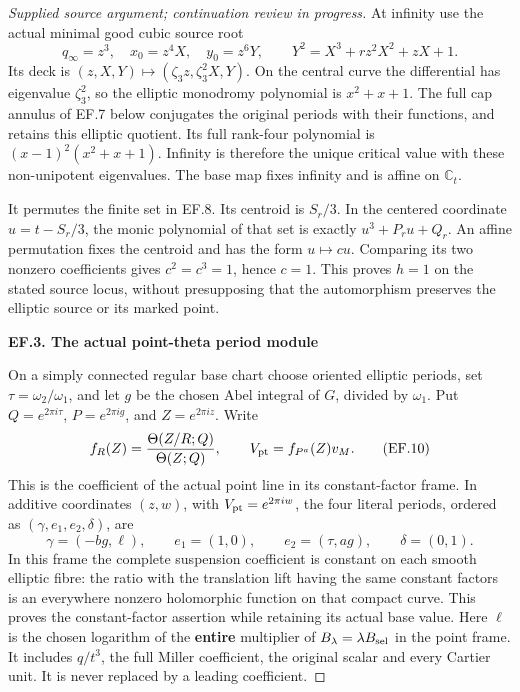 \begin{proof}[Supplied source argument; continuation review in progress]
At infinity use the actual minimal good cubic source root
\[
 q_\infty=z^3,\quad x_0=z^4X,\quad y_0=z^6Y,\qquad
 Y^2=X^3+r z^2X^2+zX+1.
 \tag{EF.9}
\]
Its deck is \((z,X,Y)\mapsto(\zeta_3z,\zeta_3^2X,Y)\).
On the central curve the differential has eigenvalue \(\zeta_3^2\),
so the elliptic monodromy polynomial is \(x^2+x+1\). The full cap
annulus of EF.7 below conjugates the original periods with their
functions, and retains this elliptic quotient. Its full rank-four
polynomial is \((x-1)^2(x^2+x+1)\). Infinity is therefore the unique
critical value with these non-unipotent eigenvalues. The base map fixes
infinity and is affine on \(\mathbb C_t\).

It permutes the finite set in EF.8. Its centroid is \(S_r/3\).
In the centered coordinate \(u=t-S_r/3\), the monic polynomial of
that set is exactly \(u^3+P_ru+Q_r\). An affine permutation fixes
the centroid and has the form \(u\mapsto c u\). Comparing its two
nonzero coefficients gives \(c^2=c^3=1\), hence \(c=1\).
This proves \(h=1\) on the stated source locus, without presupposing
that the automorphism preserves the elliptic source or its marked point.

\par

\medskip\noindent\textbf{EF.3. The actual point-theta period module}

\par\nobreak

On a simply connected regular base chart choose oriented elliptic
periods, set \(\tau=\omega_2/\omega_1\), and let \(g\) be the
chosen Abel integral of \(G\), divided by \(\omega_1\). Put
\(Q=e^{2\pi i\tau}\), \(P=e^{2\pi ig}\), and
\(Z=e^{2\pi iz}\). Write
\[
 f_R(Z)=\frac{\Theta(Z/R;Q)}{\Theta(Z;Q)},\qquad
 V_{\rm pt}=f_{P^a}(Z)v_M.
 \tag{EF.10}
\]
This is the coefficient of the actual point line in its constant-factor
frame. In additive coordinates \((z,w)\), with
\(V_{\rm pt}=e^{2\pi iw}\), the four literal periods, ordered as
\((\gamma,e_1,e_2,\delta)\), are
\[
 \gamma=(-bg,\ell),\qquad e_1=(1,0),\qquad
 e_2=(\tau,ag),\qquad \delta=(0,1).
 \tag{EF.11}
\]
In this frame the complete suspension coefficient is constant on each
smooth elliptic fibre: the ratio with the translation lift having the
same constant factors is an everywhere nonzero holomorphic function on
that compact curve. This proves the constant-factor assertion while
retaining its actual base value. Here \(\ell\) is the chosen logarithm
of the \textbf{entire} multiplier
of \(B_\lambda=\lambda B_{\rm sel}\) in the point frame. It includes
\(q/t^3\), the full Miller coefficient, the original scalar and every
Cartier unit. It is never replaced by a leading coefficient.


\end{proof}
